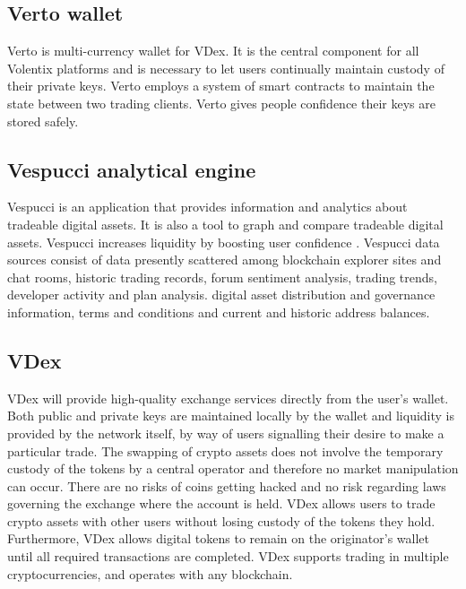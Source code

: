 \documentclass[]{article}
\begin{document}
\subsection {Verto wallet}
Verto is multi-currency wallet for VDex. It is the central component for all Volentix platforms and is necessary to let users continually maintain custody of their private keys.
Verto employs a system of smart contracts to maintain the state between two trading clients.
Verto gives people confidence their keys are stored safely.

\subsection {Vespucci analytical engine}
Vespucci is an application that provides information and analytics about tradeable digital assets. It is also a tool to graph and compare tradeable digital assets. 
Vespucci increases liquidity by boosting user confidence .
Vespucci data sources consist of data presently scattered among blockchain explorer sites and chat rooms,
historic trading records, forum sentiment analysis, trading trends, developer activity and plan analysis.
digital asset distribution and governance information, terms and conditions and current and historic address balances.





\subsection {VDex}

VDex will provide high-quality exchange services directly from the user's wallet.
Both public and private keys are maintained locally by the wallet and liquidity is provided by the network itself, by way of users signalling their desire to make a particular trade. 
The swapping of crypto assets does not involve the temporary custody of the tokens by a central operator and therefore no market manipulation can occur.
There are no risks of coins getting hacked and no risk regarding laws governing the exchange where the account is held.
VDex allows users to trade crypto assets with other users without losing custody of the tokens they hold. 
Furthermore, VDex allows digital tokens to remain on the originator's wallet until all required transactions are completed. VDex supports trading in multiple cryptocurrencies, and operates with any blockchain.
\end{document}
